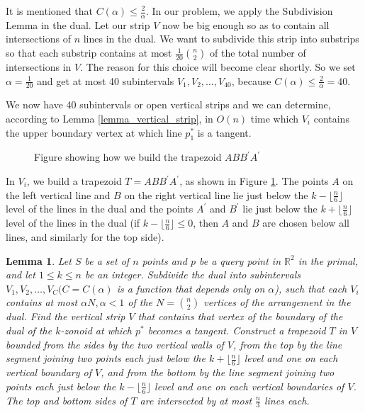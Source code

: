 \documentclass[charterfonts,lotsofwhite]{patmorin}
\newtheorem{lemma}{Lemma}
\begin{document}
It is mentioned that $C(\alpha) \le \frac{2}{\alpha}$. In our problem, we apply the Subdivision Lemma in the dual. Let our strip $V$ now be big enough so as to contain all intersections of $n$ lines in the dual. We want to subdivide this strip into substrips so that each substrip contains at most $\frac{1}{20}{n\choose 2}$ of the total number of intersections in $V$. The reason for this choice will become clear shortly. So we set $\alpha = \frac{1}{20}$ and get at most 40 subintervals $V_1, V_2, \ldots, V_{40}$, because $C(\alpha) \le \frac{2}{\alpha} = 40$. 

We now have 40 subintervals or open vertical strips and we can
determine, according to Lemma \ref{lemma_vertical_strip}, in $O(n)$
time which $V_i$ contains the upper boundary vertex at which line
$p_1^*$ is a tangent. 

\begin{figure}[h!]
 \begin{center}
   \caption{\label{fig_trapezoid}Figure showing how we build the trapezoid $ABB^{\prime}A^{\prime}$}
 \end{center}
\end{figure}

In $V_i$, we build a trapezoid $T = ABB^{\prime}A^{\prime}$, as shown in Figure \ref{fig_trapezoid}. The points $A$ on the left vertical line and $B$ on the right vertical line lie just below the $k - \lfloor\frac{n}{6}\rfloor$ level of the lines in the dual and the points $A^{\prime}$ and $B^{\prime}$ lie just below the $k + \lfloor\frac{n}{6}\rfloor$ level of the lines in the dual (if $k - \lfloor\frac{n}{6}\rfloor \le 0$, then $A$ and $B$ are chosen below all lines, and similarly for the top side).

\begin{lemma}\label{lemma_trapezoid}
Let $S$ be a set of $n$ points and $p$ be a query point in $\mathbb{R}^2$ in the primal, and let $1 \le k \le n$ be an integer. Subdivide the dual into subintervals $V_1, V_2, \ldots, V_C (C = C(\alpha)$ is a function that depends only on $\alpha$), such that each $V_i$ contains at most $\alpha N, \alpha<1$ of the $N = {n \choose 2}$ vertices of the arrangement in the dual. Find the vertical strip $V$ that contains that vertex of the boundary of the dual of the $k$-zonoid at which $p^*$ becomes a tangent. Construct a trapezoid $T$ in $V$ bounded from the sides by the two vertical walls of $V$, from the top by the line segment joining two points each just below the $k+\lfloor\frac{n}{6}\rfloor$ level and one on each vertical boundary of $V$, and from the bottom by the line segment joining two points each just below the $k-\lfloor\frac{n}{6}\rfloor$ level and one on each vertical boundaries of $V$. The top and bottom sides of $T$ are intersected by at most $\frac{n}{3}$ lines each.
\end{lemma}
\end{document}
